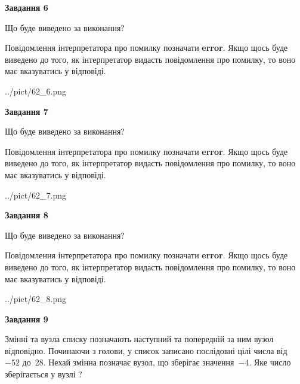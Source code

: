 \documentclass[12pt, ukrainian]{article}
\begin{document}
{\begin {large}
{\begin {center}\textbf{Завдання 6}\end {center}}\par
Що буде виведено за виконання?

Повідомлення інтерпретатора про помилку позначати \textbf{error}.
Якщо щось буде виведено до того, як інтерпретатор видасть повідомлення про помилку, 
то воно має вказуватись у відповіді. \par


\begin{center}
	{../pict/62_6.png}
\end{center}
\newpage

{\begin {center}\textbf{Завдання 7}\end {center}}\par
Що буде виведено за виконання?

Повідомлення інтерпретатора про помилку позначати \textbf{error}.
Якщо щось буде виведено до того, як інтерпретатор видасть повідомлення про помилку, 
то воно має вказуватись у відповіді. \par


\begin{center}
	{../pict/62_7.png}
\end{center}
\newpage

{\begin {center}\textbf{Завдання 8}\end {center}}\par
Що буде виведено за виконання?

Повідомлення інтерпретатора про помилку позначати \textbf{error}.
Якщо щось буде виведено до того, як інтерпретатор видасть повідомлення про помилку, 
то воно має вказуватись у відповіді. \par


\begin{center}
	{../pict/62_8.png}
\end{center}
\newpage

{\begin {center}\textbf{Завдання 9}\end {center}}\par
Змінні  та  вузла списку позначають наступний та попередній за ним вузол відповідно. Починаючи з голови, у список записано послідовні цілі числа від~$-52$ до~$28$. Нехай змінна  позначає вузол, що зберігає значення~$-4$.
Яке число зберігається у вузлі  ?\par
\newpage


\end{large}}
\end{document}
